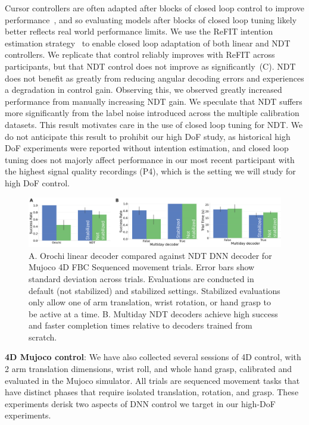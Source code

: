 \documentclass[12pt,oneside]{report}
\begin{document}
Cursor controllers are often adapted after blocks of closed loop control to improve performance~\citep{jarosiewicz2013advantages,gilja2012high,willett2017comparison}, and so evaluating models after blocks of closed loop tuning likely better reflects real world performance limits. We use the ReFIT intention estimation strategy~\citep{gilja2012high} to enable closed loop adaptation of both linear and NDT controllers. We replicate that control reliably improves with ReFIT across participants, but that NDT control does not improve as significantly~(C). NDT does not benefit as greatly from reducing angular decoding errors and experiences a degradation in control gain. Observing this, we observed greatly increased performance from manually increasing NDT gain. We speculate that NDT suffers more significantly from the label noise introduced across the multiple calibration datasets. This result motivates care in the use of closed loop tuning for NDT. We do not anticipate this result to prohibit our high DoF study, as historical high DoF experiments were reported without intention estimation, and closed loop tuning does not majorly affect performance in our most recent participant with the highest signal quality recordings (P4), which is the setting we will study for high DoF control.

\begin{figure}[h]
  \centering
  \includegraphics[width=1.0\linewidth]{ch3_mujoco_results.png}
  \caption{A. Orochi linear decoder compared against NDT DNN decoder for Mujoco 4D FBC Sequenced movement trials. Error bars show standard deviation across trials. Evaluations are conducted in default (not stabilized) and stabilized settings. Stabilized evaluations only allow one of arm translation, wrist rotation, or hand grasp to be active at a time. B. Multiday NDT decoders achieve high success and faster completion times relative to decoders trained from scratch.}
  \label{fig:mujoco}
\end{figure}

\textbf{4D Mujoco control}: We have also collected several sessions of 4D control, with 2 arm translation dimensions, wrist roll, and whole hand grasp, calibrated and evaluated in the Mujoco simulator. All trials are sequenced movement tasks that have distinct phases that require isolated translation, rotation, and grasp. These experiments derisk two aspects of DNN control we target in our high-DoF experiments.
\end{document}
